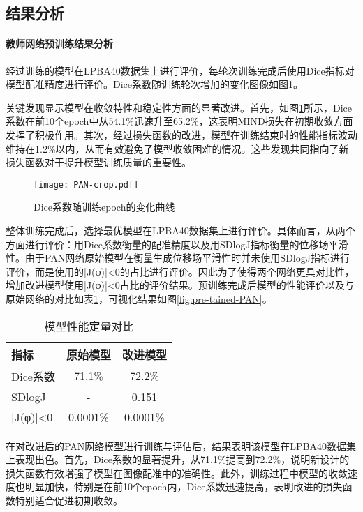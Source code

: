 \subsection{结果分析}

\paragraph{教师网络预训练结果分析}

经过训练的模型在LPBA40数据集上进行评价，每轮次训练完成后使用Dice指标对模型配准精度进行评价。Dice系数随训练轮次增加的变化图像如图\ref{fig:PANDice}。

关键发现显示模型在收敛特性和稳定性方面的显著改进。首先，如图\ref{fig:PANDice}所示，Dice系数在前10个epoch中从54.1\%迅速升至65.2\%，这表明MIND损失在初期收敛方面发挥了积极作用。其次，经过损失函数的改进，模型在训练结束时的性能指标波动维持在1.2\%以内，从而有效避免了模型收敛困难的情况。这些发现共同指向了新损失函数对于提升模型训练质量的重要性。

\begin{figure}[h]
    \centering
    \texttt{[image: PAN-crop.pdf]}
    \caption{Dice系数随训练epoch的变化曲线}
    \label{fig:PANDice}
\end{figure}

整体训练完成后，选择最优模型在LPBA40数据集上进行评价。具体而言，从两个方面进行评价：用Dice系数衡量的配准精度以及用SDlogJ指标衡量的位移场平滑性。由于PAN网络原始模型在衡量生成位移场平滑性时并未使用SDlogJ指标进行评价，而是使用的|J(φ)|<0的占比进行评价。因此为了使得两个网络更具对比性，增加改进模型使用|J(φ)|<0占比的评价结果。预训练完成后模型的性能评价以及与原始网络的对比如表\ref{tab:PANresult}，可视化结果如图\ref{fig:pre-tained-PAN}。

\begin{table}[h]
    \centering
    \caption{模型性能定量对比}
    \label{tab:PANresult}
    \begin{tabular}{lcc}
        \toprule
        \textbf{指标} & \textbf{原始模型} & \textbf{改进模型} \\
        \midrule
        Dice系数      & 71.1\%        & 72.2\%        \\
        SDlogJ      & -             & 0.151         \\
        |J(φ)|<0    & 0.0001\%      & 0.0001\%      \\
        \bottomrule
    \end{tabular}
\end{table}

在对改进后的PAN网络模型进行训练与评估后，结果表明该模型在LPBA40数据集上表现出色。首先，Dice系数的显著提升，从71.1\%提高到72.2\%，说明新设计的损失函数有效增强了模型在图像配准中的准确性。此外，训练过程中模型的收敛速度也明显加快，特别是在前10个epoch内，Dice系数迅速提高，表明改进的损失函数特别适合促进初期收敛。

